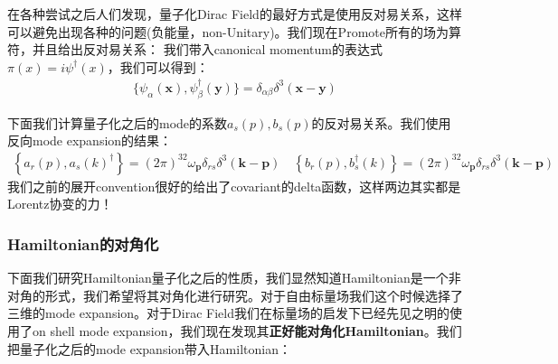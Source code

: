 
在各种尝试之后人们发现，量子化Dirac
Field的最好方式是使用反对易关系，这样可以避免出现各种的问题(负能量，non-Unitary)。我们现在Promote所有的场为算符，并且给出反对易关系：
我们带入canonical momentum的表达式$ \pi(x) = i\psi^\dagger(x) $，我们可以得到：
\begin{align}
  \{\psi_\alpha(\mathbf{x}),\psi_\beta^\dagger(\mathbf{y})\}=\delta_{\alpha\beta}\delta^3(\mathbf{x}-\mathbf{y})
\end{align}

\bigskip
{}

下面我们计算量子化之后的mode的系数$ a_s(p),b_s(p) $的反对易关系。我们使用反向mode expansion的结果：
\begin{align}
  \left\{a_r(p),a_s(k)^{\dagger}\right\}=(2\pi)^32\omega_\mathbf{p}\delta_{rs}\delta^3(\mathbf{k}-\mathbf{p})\quad\left\{b_r(p),b_s^{\dagger}(k)\right\}=(2\pi)^32\omega_\mathbf{p}\delta_{rs}\delta^3(\mathbf{k}-\mathbf{p})
\end{align}
我们之前的展开convention很好的给出了covariant的delta函数，这样两边其实都是Lorentz协变的力！

\subsubsection{Hamiltonian的对角化}


下面我们研究Hamiltonian量子化之后的性质，我们显然知道Hamiltonian是一个非对角的形式，我们希望将其对角化进行研究。对于自由标量场我们这个时候选择了三维的mode
expansion。对于Dirac Field我们在标量场的启发下已经先见之明的使用了on shell mode
expansion，我们现在发现其\textbf{正好能对角化Hamiltonian}。我们把量子化之后的mode
expansion带入Hamiltonian：

